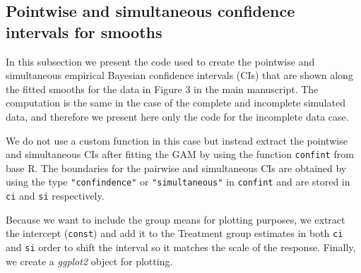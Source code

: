 \documentclass[
]{article}
\newcommand{\passthrough}[1]{#1}
\begin{document}
\hypertarget{pointwise-and-simultaneous-confidence-intervals-for-smooths}{%
\subsection{Pointwise and simultaneous confidence intervals for smooths}\label{pointwise-and-simultaneous-confidence-intervals-for-smooths}}

In this subsection we present the code used to create the pointwise and simultaneous empirical Bayesian confidence intervals (CIs) that are shown along the fitted smooths for the data in Figure 3 in the main manuscript. The computation is the same in the case of the complete and incomplete simulated data, and therefore we present here only the code for the incomplete data case.

We do not use a custom function in this case but instead extract the pointwise and simultaneous CIs after fitting the GAM by using the function \passthrough{\lstinline!confint!} from base R. The boundaries for the pairwise and simultaneous CIs are obtained by using the type \passthrough{\lstinline!"confindence"!} or \passthrough{\lstinline!"simultaneous"!} in \passthrough{\lstinline!confint!} and are stored in \passthrough{\lstinline!ci!} and \passthrough{\lstinline!si!} respectively.

Because we want to include the group means for plotting purposes, we extract the intercept (\passthrough{\lstinline!const!}) and add it to the Treatment group estimates in both \passthrough{\lstinline!ci!} and \passthrough{\lstinline!si!} order to shift the interval so it matches the scale of the response. Finally, we create a \emph{ggplot2} object for plotting.
\end{document}
